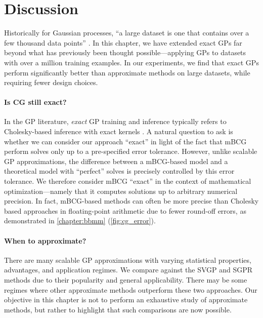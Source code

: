 \section{Discussion}

Historically for Gaussian processes, ``a large dataset is one that contains over a few thousand data points'' \citep{hensman2013gaussian}.
In this chapter, we have extended exact GPs far beyond what has previously been thought possible---applying GPs to datasets with over a million training examples.
In our experiments, we find that exact GPs perform significantly better than approximate methods on large datasets, while requiring fewer design choices.

\paragraph{Is CG still exact?}
In the GP literature, \emph{exact} GP training and inference typically refers to Cholesky-based inference with exact kernels \citep{rasmussen2006gaussian}.
A natural question to ask is whether we can consider our approach ``exact'' in light of the fact that mBCG perform solves only up to a pre-specified error tolerance.
However, unlike scalable GP approximations, the difference between a mBCG-based model and a theoretical model with ``perfect'' solves is precisely controlled by this error tolerance.
We therefore consider mBCG ``exact'' in the context of mathematical optimization---namely that it computes solutions up to arbitrary numerical precision.
In fact, mBCG-based methods can often be more precise than Cholesky based approaches in floating-point arithmetic due to fewer round-off errors, as demonstrated in \cref{chapter:bbmm} (\cref{fig:cg_error}).

\paragraph{When to approximate?}
There are many scalable GP approximations with varying statistical properties, advantages, and application regimes.
We compare against the SVGP and SGPR methods due to their popularity and general applicability.
There may be some regimes where other approximate methods outperform these two approaches.
Our objective in this chapter is not to perform an exhaustive study of approximate methods, but rather to highlight that such comparisons are now possible.

